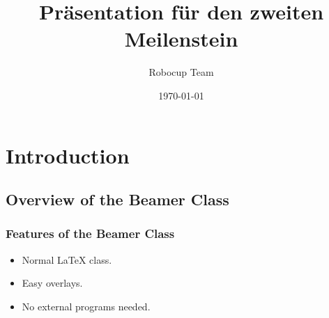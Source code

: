 \documentclass{beamer}
\title{Präsentation für den zweiten Meilenstein}
\author{Robocup Team}
\date{\today}
\begin{document}
\frame{\titlepage}

\section[Outline]{}
\frame{\tableofcontents}

\section{Introduction}
\subsection{Overview of the Beamer Class}
\frame
{
  \frametitle{Features of the Beamer Class}

  \begin{itemize}
  \item<1-> Normal LaTeX class.
  \item<2-> Easy overlays.
  \item<3-> No external programs needed.      
  \end{itemize}
}
\end{document}
